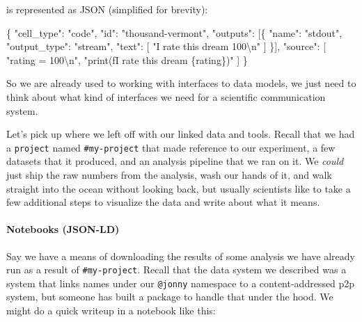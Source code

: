 \documentclass[10pt]{article}
\newenvironment{Shaded}{}{}
\newcommand{\CharTok}[1]{\textcolor[rgb]{0.25,0.44,0.63}{#1}}
\newcommand{\DataTypeTok}[1]{\textcolor[rgb]{0.56,0.13,0.00}{#1}}
\newcommand{\FunctionTok}[1]{\textcolor[rgb]{0.02,0.16,0.49}{#1}}
\newcommand{\OtherTok}[1]{\textcolor[rgb]{0.00,0.44,0.13}{#1}}
\newcommand{\StringTok}[1]{\textcolor[rgb]{0.25,0.44,0.63}{#1}}
\begin{document}
\begin{multicols}{2}
is represented as JSON (simplified for brevity):

\begin{Shaded}
\begin{Highlighting}[]
\FunctionTok{\{}
  \DataTypeTok{"cell\_type"}\FunctionTok{:} \StringTok{"code"}\FunctionTok{,}
  \DataTypeTok{"id"}\FunctionTok{:} \StringTok{"thousand{-}vermont"}\FunctionTok{,}
  \DataTypeTok{"outputs"}\FunctionTok{:} \OtherTok{[}\FunctionTok{\{}
    \DataTypeTok{"name"}\FunctionTok{:} \StringTok{"stdout"}\FunctionTok{,}
    \DataTypeTok{"output\_type"}\FunctionTok{:} \StringTok{"stream"}\FunctionTok{,}
    \DataTypeTok{"text"}\FunctionTok{:} \OtherTok{[}
      \StringTok{"I rate this dream 100}\CharTok{\textbackslash{}n}\StringTok{"}
    \OtherTok{]}
  \FunctionTok{\}}\OtherTok{]}\FunctionTok{,}
  \DataTypeTok{"source"}\FunctionTok{:} \OtherTok{[}
    \StringTok{"rating = 100}\CharTok{\textbackslash{}n}\StringTok{"}\OtherTok{,}
    \StringTok{"print(f\textquotesingle{}I rate this dream \{rating\}\textquotesingle{})"}
  \OtherTok{]}
\FunctionTok{\}}
\end{Highlighting}
\end{Shaded}

So we are already used to working with interfaces to data models, we
just need to think about what kind of interfaces we need for a
scientific communication system.

Let's pick up where we left off with our linked data and tools. Recall
that we had a \texttt{project} named \texttt{\#my-project} that made
reference to our experiment, a few datasets that it produced, and an
analysis pipeline that we ran on it. We \emph{could} just ship the raw
numbers from the analysis, wash our hands of it, and walk straight into
the ocean without looking back, but usually scientists like to take a
few additional steps to visualize the data and write about what it
means.

\hypertarget{notebooks-json-ld}{%
\paragraph{Notebooks (JSON-LD)}\label{notebooks-json-ld}}

Say we have a means of downloading the results of some analysis we have
already run as a result of \texttt{\#my-project}. Recall that the data
system we described was a system that links names under our
\texttt{@jonny} namespace to a content-addressed p2p system, but someone
has built a package to handle that under the hood. We might do a quick
writeup in a notebook like this:


\end{multicols}
\end{document}
